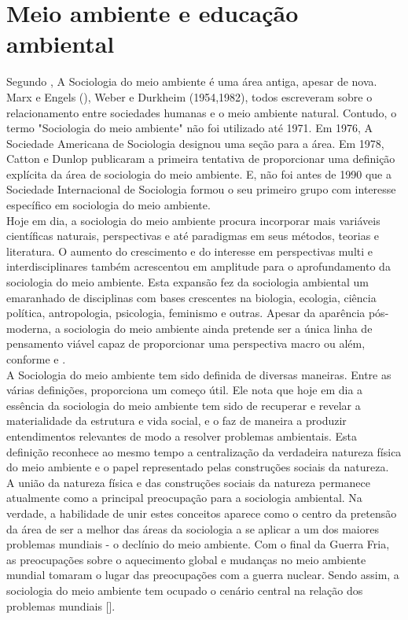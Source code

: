 \section{Meio ambiente e educação ambiental}

Segundo , A Sociologia do meio ambiente é uma área antiga, apesar de nova. Marx e Engels (), Weber e Durkheim (1954,1982), todos escreveram sobre o relacionamento entre sociedades humanas e o meio ambiente natural. Contudo, o termo "Sociologia do meio ambiente" não foi utilizado até 1971. Em 1976, A Sociedade Americana de Sociologia designou uma seção para a área. Em 1978, Catton e Dunlop publicaram a primeira tentativa de proporcionar uma definição explícita da área de sociologia do meio ambiente. E, não foi antes de 1990 que a Sociedade Internacional de Sociologia formou o seu primeiro grupo com interesse específico em sociologia do meio ambiente.\\

Hoje em dia, a sociologia do meio ambiente procura incorporar mais variáveis científicas naturais, perspectivas e até paradigmas em seus métodos, teorias e literatura. O aumento do crescimento e do interesse em perspectivas multi e interdisciplinares também acrescentou em amplitude para o aprofundamento da sociologia do meio ambiente. Esta expansão fez da sociologia ambiental um emaranhado de disciplinas com bases crescentes na biologia, ecologia, ciência política, antropologia, psicologia, feminismo e outras. Apesar da aparência pós-moderna, a sociologia do meio ambiente ainda pretende ser a única linha de pensamento viável capaz de proporcionar uma perspectiva macro ou além, conforme  e . \\

A Sociologia do meio ambiente tem sido definida de diversas maneiras. Entre as várias definições,   proporciona um começo útil. Ele nota que hoje em dia a essência da sociologia do meio ambiente tem sido de recuperar e revelar a materialidade da estrutura e vida social, e o faz de maneira a produzir entendimentos relevantes de modo a resolver problemas ambientais. Esta definição reconhece ao mesmo tempo a centralização da verdadeira natureza física do meio ambiente e o papel representado pelas construções sociais da natureza.\\

A união da natureza física e das construções sociais da natureza permanece atualmente como a principal preocupação para a sociologia ambiental. Na verdade, a habilidade de unir estes conceitos aparece como o centro da pretensão da área de ser a melhor das áreas da sociologia a se aplicar a um dos maiores problemas mundiais - o declínio do meio ambiente. Com o final da Guerra Fria, as preocupações sobre o aquecimento global e mudanças no meio ambiente mundial tomaram o lugar das preocupações com a guerra nuclear. Sendo assim, a sociologia do meio ambiente tem ocupado o cenário central na relação dos problemas mundiais [].\\

